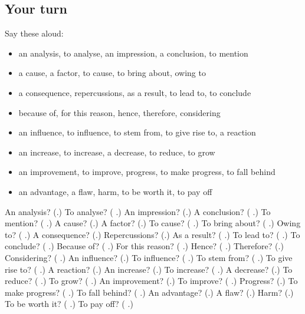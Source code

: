 \subsection*{Your turn}
Say these aloud:

\begin{itemize}
\raggedright
  \item an analysis, to analyse, an impression, a conclusion, to mention
  \item a cause, a factor, to cause, to bring about, owing to
  \item a consequence, repercussions, as a result, to lead to, to conclude
  \item because of, for this reason, hence, therefore, considering
  \item an influence, to influence, to stem from, to give rise to, a reaction
  \item an increase, to increase, a decrease, to reduce, to grow
  \item an improvement, to improve, progress, to make progress, to fall behind
  \item an advantage, a flaw, harm, to be worth it, to pay off
\end{itemize}

\begin{tcolorbox}[breakable,colback=teal!4,colframe=teal!35!black,title={Before you move on}]
An analysis? (\textbf{}.) To analyse? (\textbf{ }.) An impression? (\textbf{}.) A conclusion? (\textbf{ }.) To mention? (\textbf{ }.) A cause? (\textbf{}.) A factor? (\textbf{}.) To cause? (\textbf{ }.) To bring about? (\textbf{ }.) Owing to? (\textbf{ }.) A consequence? (\textbf{}.) Repercussions? (\textbf{}.) As a result? (\textbf{ }.) To lead to? (\textbf{ }.) To conclude? (\textbf{ }.) Because of? (\textbf{ }.) For this reason? (\textbf{  }.) Hence? (\textbf{  }.) Therefore? (\textbf{}.) Considering? (\textbf{  }.) An influence? (\textbf{}.) To influence? (\textbf{ }.) To stem from? (\textbf{ }.) To give rise to? (\textbf{ }.) A reaction? (\textbf{}.) An increase? (\textbf{}.) To increase? (\textbf{ }.) A decrease? (\textbf{}.) To reduce? (\textbf{ }.) To grow? (\textbf{ }.) An improvement? (\textbf{}.) To improve? (\textbf{ }.) Progress? (\textbf{}.) To make progress? (\textbf{ }.) To fall behind? (\textbf{ }.) An advantage? (\textbf{}.) A flaw? (\textbf{}.) Harm? (\textbf{}.) To be worth it? (\textbf{ }.) To pay off? (\textbf{ }.)
\end{tcolorbox}
